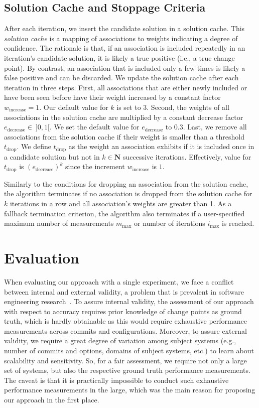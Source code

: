 \documentclass[sigconf, screen]{acmart}
\begin{document}
	\subsection{Solution Cache and Stoppage Criteria}\label{sec:solutioncache}
	After each iteration, we insert the candidate solution in a solution cache. This \textit{solution cache} is a mapping of associations to weights indicating a degree of confidence. 
	The rationale is that, if an association is included repeatedly in an iteration's candidate solution, it is likely a true positive (i.e., a true change point). 
	By contrast, an association that is included only a few times is likely a false positive and can be discarded. 
	We update the solution cache after each iteration in three steps. 
	First, all associations that are either newly included or have been seen before have their weight increased by a constant factor $w_\text{increase} = 1$. Our default value for $k$ is set to 3.
	Second, the weights of all associations in the solution cache are multiplied by a constant decrease factor $e_\text{decrease}\in~\rbrack 0,1 \lbrack$. We set the default value for $e_\text{decrease}$ to 0.3.
	Last, we remove all associations from the solution cache if their weight is smaller than a threshold $t_\text{drop}$. We define $t_\text{drop}$ as the weight an association exhibits if it is included once in a candidate solution but not in $k \in \mathbf{N}$ successive iterations. Effectively, value for $t_\text{drop}$ is $({e_\text{decrease}})^k$ since the increment $w_\text{increase}$ is $1$.
	
	Similarly to the conditions for dropping an association from the solution cache, the algorithm terminates if no association is dropped from the solution cache for $k$ iterations in a row and all association's weights are greater than 1. As a fallback termination criterion, the algorithm also terminates if a user-specified maximum number of measurements $m_\text{max}$ or number of iterations $i_\text{max}$ is reached. 
	
	\section{Evaluation}
	When evaluating our approach with a single experiment, we face a conflict between internal and external validity, a problem that is prevalent in software engineering research~\cite{siegmund_views_2015}. 
	To assure internal validity, the assessment of our approach with respect to accuracy requires prior knowledge of change points as ground truth, which is hardly obtainable as this would require exhaustive performance measurements across commits and configurations. Moreover, to assure  external validity, we require a great degree of variation among subject systems (e.g., number of commits and options, domains of subject systems, etc.) to learn about scalability and sensitivity. 
	So, for a fair assessment, we require not only a large set of systems, but also the respective ground truth performance measurements. The caveat is that it is practically impossible to conduct such exhaustive performance measurements in the large, which was the main reason for proposing our approach in the first place.
	
\end{document}
